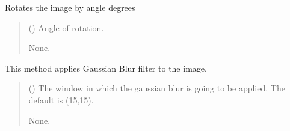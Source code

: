 \documentclass[letterpaper,10pt,english]{sphinxmanual}
\begin{document}
\begin{fulllineitems}
\label{\detokenize{forensicfit.utils.image_tools:forensicfit.utils.image_tools.rotate_image}}
\pysigstartsignatures
{}
\pysigstopsignatures
\sphinxAtStartPar
Rotates the image by angle degrees
\begin{quote}\begin{description}
\sphinxAtStartPar
{} () \textendash{} Angle of rotation.

\sphinxAtStartPar
None.

\end{description}\end{quote}

\end{fulllineitems}


\begin{fulllineitems}
\label{\detokenize{forensicfit.utils.image_tools:forensicfit.utils.image_tools.gaussian_blur}}
\pysigstartsignatures
{}
\pysigstopsignatures
\sphinxAtStartPar
This method applies Gaussian Blur filter to the image.
\begin{quote}\begin{description}
\sphinxAtStartPar
{} (\sphinxstyleliteralemphasis{\sphinxupquote{, }}) \textendash{} The window in which the gaussian blur is going to be applied.
The default is (15,15).

\sphinxAtStartPar
None.

\end{description}\end{quote}

\end{fulllineitems}
\end{document}

